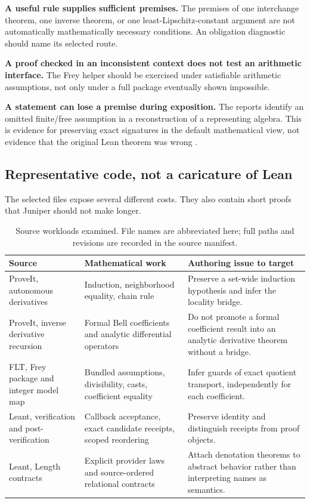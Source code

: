 \documentclass[11pt,a4paper]{article}
\theoremstyle{definition}\newtheorem{definition}[theorem]{Definition}
\theoremstyle{remark}\newtheorem{remark}[theorem]{Remark}
\begin{document}
\textbf{A useful rule supplies sufficient premises.} The premises of one interchange theorem, one inverse theorem, or one least-Lipschitz-constant argument are not automatically mathematically necessary conditions. An obligation diagnostic should name its selected route.

\textbf{A proof checked in an inconsistent context does not test an arithmetic interface.} The Frey helper should be exercised under satisfiable arithmetic assumptions, not only under a full package eventually shown impossible.

\textbf{A statement can lose a premise during exposition.} The reports identify an omitted finite/free assumption in a reconstruction of a representing algebra. This is evidence for preserving exact signatures in the default mathematical view, not evidence that the original Lean theorem was wrong \cite{synA,synB}.

\subsection{Representative code, not a caricature of Lean}
The selected files expose several different costs. They also contain short proofs that Juniper should not make longer.

\begin{table}[htbp]\small
\caption{Source workloads examined. File names are abbreviated here; full paths and revisions are recorded in the source manifest.}
\begin{tabularx}{\textwidth}{@{}L{31mm}Y Y@{}}\toprule
Source & Mathematical work & Authoring issue to target\\\midrule
ProveIt, autonomous derivatives & Induction, neighborhood equality, chain rule & Preserve a set-wide induction hypothesis and infer the locality bridge.\\
ProveIt, inverse derivative recursion & Formal Bell coefficients and analytic differential operators & Do not promote a formal coefficient result into an analytic derivative theorem without a bridge.\\
FLT, Frey package and integer model map & Bundled assumptions, divisibility, casts, coefficient equality & Infer guards of exact quotient transport, independently for each coefficient.\\
Leant, verification and post-verification & Callback acceptance, exact candidate receipts, scoped reordering & Preserve identity and distinguish receipts from proof objects.\\
Leant, Length contracts & Explicit provider laws and source-ordered relational contracts & Attach denotation theorems to abstract behavior rather than interpreting names as semantics.\\\bottomrule
\end{tabularx}
\end{table}
\end{document}
